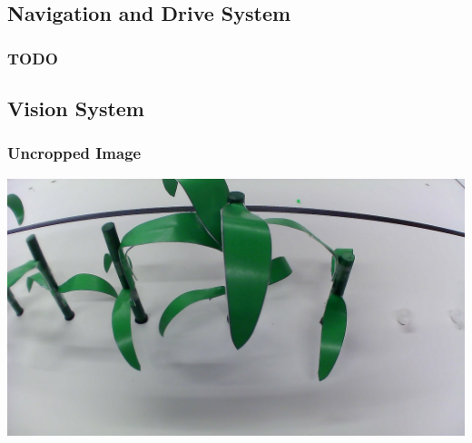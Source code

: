 \documentclass[11pt, twoside]{report}
\begin{document}
\subsection{Navigation and Drive System} \label{app:nav}
\subsubsection{TODO}


\subsection{Vision System} \label{app:vision}
\subsubsection{Uncropped Image} \label{app:uncrop}
	\begin{center}
	\includegraphics[scale=.2]{uncropped.jpg}
	\end{center}
\end{document}
